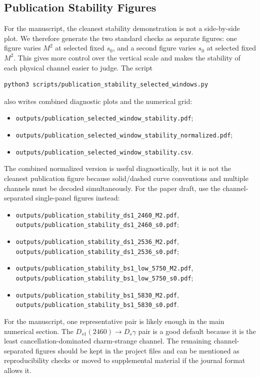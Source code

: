 \documentclass[11pt]{article}
\begin{document}
\subsection{Publication Stability Figures}

For the manuscript, the cleanest stability demonstration is not a side-by-side
plot.  We therefore generate the two standard checks as separate figures:
one figure varies \(M^2\) at selected fixed \(s_0\), and a second figure varies
\(s_0\) at selected fixed \(M^2\).  This gives more control over the vertical
scale and makes the stability of each physical channel easier to judge.  The
script
\begin{verbatim}
python3 scripts/publication_stability_selected_windows.py
\end{verbatim}
also writes combined diagnostic plots and the numerical grid:
\begin{itemize}
  \item \texttt{outputs/publication\_selected\_window\_stability.pdf};
  \item \texttt{outputs/publication\_selected\_window\_stability\_normalized.pdf};
  \item \texttt{outputs/publication\_selected\_window\_stability.csv}.
\end{itemize}
The combined normalized version is useful diagnostically, but it is not the
cleanest publication figure because solid/dashed curve conventions and multiple
channels must be decoded simultaneously.  For the paper draft, use the
channel-separated single-panel figures instead:
\begin{itemize}
  \item \texttt{outputs/publication\_stability\_ds1\_2460\_M2.pdf},
  \texttt{outputs/publication\_stability\_ds1\_2460\_s0.pdf};
  \item \texttt{outputs/publication\_stability\_ds1\_2536\_M2.pdf},
  \texttt{outputs/publication\_stability\_ds1\_2536\_s0.pdf};
  \item \texttt{outputs/publication\_stability\_bs1\_low\_5750\_M2.pdf},
  \texttt{outputs/publication\_stability\_bs1\_low\_5750\_s0.pdf};
  \item \texttt{outputs/publication\_stability\_bs1\_5830\_M2.pdf},
  \texttt{outputs/publication\_stability\_bs1\_5830\_s0.pdf}.
\end{itemize}
For the manuscript, one representative pair is likely enough in the main
numerical section.  The \(D_{s1}(2460)\to D_s\gamma\) pair is a good default
because it is the least cancellation-dominated charm-strange channel.  The
remaining channel-separated figures should be kept in the project files and can
be mentioned as reproducibility checks or moved to supplemental material if the
journal format allows it.
\end{document}
